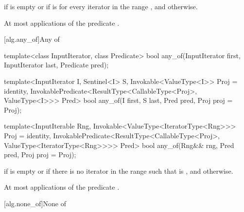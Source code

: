 \begin{itemdescr}
\pnum
\returns {} if
 is empty or if
is  for every iterator  in the range ,
and  otherwise.

\pnum
\complexity At most  applications of the predicate
.
\end{itemdescr}

[alg.any_of]{Any of}

%
\begin{removedblock}
\begin{itemdecl}
template<class InputIterator, class Predicate>
  bool any_of(InputIterator first, InputIterator last, Predicate pred);
\end{itemdecl}
\end{removedblock}
\begin{addedblock}
\begin{itemdecl}
template<InputIterator I, Sentinel<I> S,
    Invokable<ValueType<I>> Proj = identity,
    InvokablePredicate<ResultType<CallableType<Proj>, ValueType<I>>> Pred>
  bool any_of(I first, S last, Pred pred, Proj proj = Proj{});

template<InputIterable Rng,
    Invokable<ValueType<IteratorType<Rng>>> Proj = identity,
    InvokablePredicate<ResultType<CallableType<Proj>, ValueType<IteratorType<Rng>>>> Pred>
  bool any_of(Rng&& rng, Pred pred, Proj proj = Proj{});
\end{itemdecl}
\end{addedblock}

\begin{itemdescr}
\pnum
\returns {} if  is empty or
if there is no iterator  in the range
 such that
is , and  otherwise.

\pnum
\complexity At most  applications of the predicate
.
\end{itemdescr}

[alg.none_of]{None of}

